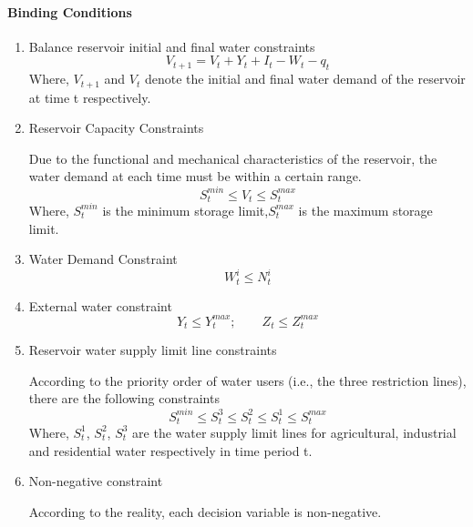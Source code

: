 \paragraph{Binding Conditions}
\begin{enumerate}[(1)]
  \item Balance reservoir initial and final water constraints
    \begin{equation}
      V_{t+1}=V_t+Y_t+I_t-W_t-q_t
    \end{equation}
    Where, $V_{t+1}$ and $V_{t}$ denote the initial and final water demand of the reservoir at time t respectively.
  \item Reservoir Capacity Constraints
  \par
  Due to the functional and mechanical characteristics of the reservoir, the water demand at each time must be within a certain range.
  \begin{equation}
    S^{min}_t\leq V_t\leq S^{max}_t
  \end{equation}
  Where, $S^{min}_t$ is the minimum storage limit,$S^{max}_t$ is the maximum storage limit.
  \item Water Demand Constraint
    \begin{equation}
      W^i_t\leq N^i_t
    \end{equation}
  \item External water constraint
    \begin{equation}
      Y_t\leq Y^{max}_t;\qquad
      Z_t\leq Z^{max}_t
    \end{equation}
  \item Reservoir water supply limit line constraints
  \par
  According to the priority order of water users (i.e., the three restriction lines), there are the following constraints
  \begin{equation}
    S^{min}_t\leq S^3_t\leq S^2_t\leq S^1_t\leq S^{max}_t
  \end{equation}
  Where, $S^1_t$, $S^2_t$, $S^3_t$ are the water supply limit lines for agricultural, industrial and residential water respectively in time period t.
  \item Non-negative constraint
  \par
  According to the reality, each decision variable is non-negative.
\end{enumerate}
